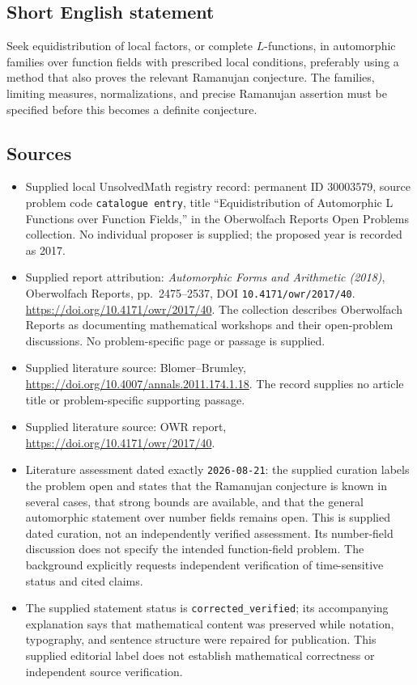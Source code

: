 \documentclass[11pt]{article}
\begin{document}
\subsection{Short English statement}
Seek equidistribution of local factors, or complete \(L\)-functions, in automorphic families over function fields with prescribed local conditions, preferably using a method that also proves the relevant Ramanujan conjecture. The families, limiting measures, normalizations, and precise Ramanujan assertion must be specified before this becomes a definite conjecture.
\subsection{Sources}
\begin{itemize}
\item Supplied local UnsolvedMath registry record: permanent ID \(30003579\), source problem code \texttt{catalogue entry}, title ``Equidistribution of Automorphic L Functions over Function Fields,'' in the Oberwolfach Reports Open Problems collection. No individual proposer is supplied; the proposed year is recorded as 2017.
\item Supplied report attribution: \emph{Automorphic Forms and Arithmetic (2018)}, Oberwolfach Reports, pp.\ 2475--2537, DOI \texttt{10.4171/owr/2017/40}. \url{https://doi.org/10.4171/owr/2017/40}. The collection describes Oberwolfach Reports as documenting mathematical workshops and their open-problem discussions. No problem-specific page or passage is supplied.
\item Supplied literature source: Blomer--Brumley, \url{https://doi.org/10.4007/annals.2011.174.1.18}. The record supplies no article title or problem-specific supporting passage.
\item Supplied literature source: OWR report, \url{https://doi.org/10.4171/owr/2017/40}.
\item Literature assessment dated exactly \texttt{2026-08-21}: the supplied curation labels the problem open and states that the Ramanujan conjecture is known in several cases, that strong bounds are available, and that the general automorphic statement over number fields remains open. This is supplied dated curation, not an independently verified assessment. Its number-field discussion does not specify the intended function-field problem. The background explicitly requests independent verification of time-sensitive status and cited claims.
\item The supplied statement status is \texttt{corrected\_verified}; its accompanying explanation says that mathematical content was preserved while notation, typography, and sentence structure were repaired for publication. This supplied editorial label does not establish mathematical correctness or independent source verification.
\end{itemize}
\end{document}
